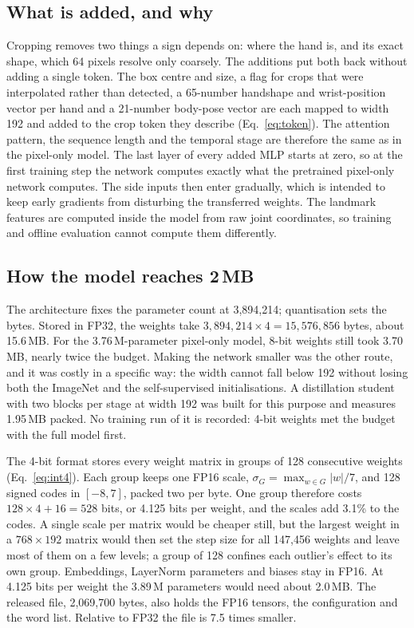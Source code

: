 \documentclass[pdflatex,sn-mathphys-num,onecolumn]{sn-jnl}
\theoremstyle{thmstyleone}%
\begin{document}
\subsection{What is added, and why}

Cropping removes two things a sign depends on: where the hand is, and its exact shape, which 64 pixels resolve only coarsely. The additions put both back without adding a single token. The box centre and size, a flag for crops that were interpolated rather than detected, a 65-number handshape and wrist-position vector per hand and a 21-number body-pose vector are each mapped to width 192 and added to the crop token they describe (Eq.~\eqref{eq:token}). The attention pattern, the sequence length and the temporal stage are therefore the same as in the pixel-only model. The last layer of every added MLP starts at zero, so at the first training step the network computes exactly what the pretrained pixel-only network computes. The side inputs then enter gradually, which is intended to keep early gradients from disturbing the transferred weights. The landmark features are computed inside the model from raw joint coordinates, so training and offline evaluation cannot compute them differently.

\subsection{How the model reaches 2\,MB}

The architecture fixes the parameter count at 3,894,214; quantisation sets the bytes. Stored in FP32, the weights take $3{,}894{,}214\times4=15{,}576{,}856$ bytes, about 15.6\,MB. For the 3.76\,M-parameter pixel-only model, 8-bit weights still took 3.70\,MB, nearly twice the budget. Making the network smaller was the other route, and it was costly in a specific way: the width cannot fall below 192 without losing both the ImageNet and the self-supervised initialisations. A distillation student with two blocks per stage at width 192 was built for this purpose and measures 1.95\,MB packed. No training run of it is recorded: 4-bit weights met the budget with the full model first.

The 4-bit format stores every weight matrix in groups of 128 consecutive weights (Eq.~\eqref{eq:int4}). Each group keeps one FP16 scale, $\sigma_G=\max_{w\in G}|w|/7$, and 128 signed codes in $[-8,7]$, packed two per byte. One group therefore costs $128\times4+16=528$ bits, or 4.125 bits per weight, and the scales add 3.1\% to the codes. A single scale per matrix would be cheaper still, but the largest weight in a $768\times192$ matrix would then set the step size for all 147,456 weights and leave most of them on a few levels; a group of 128 confines each outlier's effect to its own group. Embeddings, LayerNorm parameters and biases stay in FP16. At 4.125 bits per weight the 3.89\,M parameters would need about 2.0\,MB. The released file, 2,069,700 bytes, also holds the FP16 tensors, the configuration and the word list. Relative to FP32 the file is 7.5 times smaller.
\end{document}
